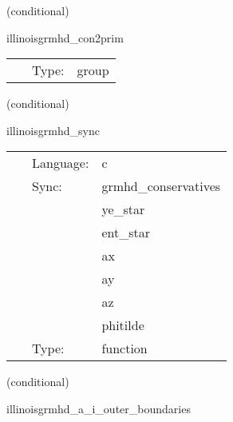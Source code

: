 \vspace{5mm}

   (conditional) 

\hspace{5mm} illinoisgrmhd\_con2prim 

\hspace{5mm}{\it compute primitive variables from conservatives } 


\hspace{5mm}

 \begin{tabular*}{160mm}{cll} 
~ & Type:  & group \\ 
\end{tabular*} 


\vspace{5mm}

   (conditional) 

\hspace{5mm} illinoisgrmhd\_sync 

\hspace{5mm}{\it sync conservative variable ghost zones for c2p routine } 


\hspace{5mm}

 \begin{tabular*}{160mm}{cll} 
~ & Language:  & c \\ 
~ & Sync:  & grmhd\_conservatives \\ 
~& ~ &ye\_star\\ 
~& ~ &ent\_star\\ 
~& ~ &ax\\ 
~& ~ &ay\\ 
~& ~ &az\\ 
~& ~ &phitilde\\ 
~ & Type:  & function \\ 
\end{tabular*} 


\vspace{5mm}

   (conditional) 

\hspace{5mm} illinoisgrmhd\_a\_i\_outer\_boundaries 



\hspace{5mm}

